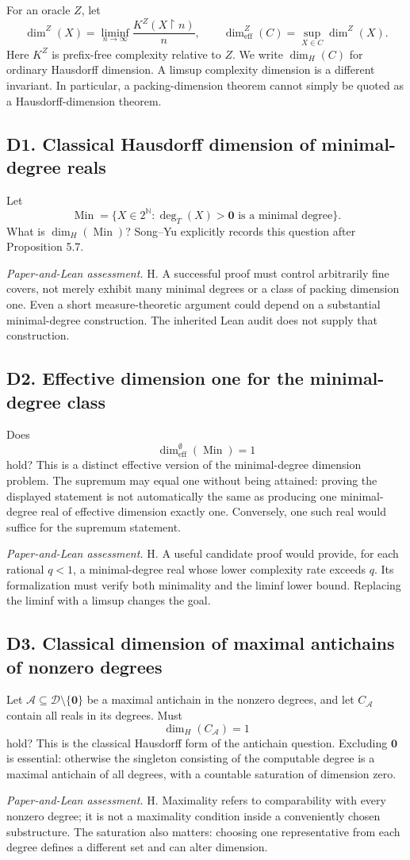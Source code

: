 \documentclass[11pt,a4paper]{article}
\newcommand{\N}{\mathbb N}
\newcommand{\D}{\mathcal D}
\newcommand{\Cantor}{2^{\N}}
\newcommand{\zero}{\mathbf0}
\newcommand{\Min}{\operatorname{Min}}\newcommand{\Computable}{\operatorname{Comp}}
\newcommand{\assessment}[1]{\par\noindent\textit{Paper-and-Lean assessment.} #1\par}
\newcommand{\problem}[2]{\subsection{#1. #2}\label{entry:#1}}
\theoremstyle{definition}\newtheorem{definition}[theorem]{Definition}
\theoremstyle{remark}\newtheorem{remark}[theorem]{Remark}
\begin{document}
For an oracle $Z$, let
\[
 \dim^Z(X)=\liminf_{n\to\infty}\frac{K^Z(X\upharpoonright n)}{n},
 \qquad
 \dim_{\mathrm{eff}}^Z(C)=\sup_{X\in C}\dim^Z(X).
\]
Here $K^Z$ is prefix-free complexity relative to $Z$. We write $\dim_H(C)$ for ordinary Hausdorff dimension. A limsup complexity dimension is a different invariant. In particular, a packing-dimension theorem cannot simply be quoted as a Hausdorff-dimension theorem.\cite{SY}

\problem{D1}{Classical Hausdorff dimension of minimal-degree reals}
Let
\[
 \Min=\{X\in\Cantor:\deg_T(X)>\zero\text{ is a minimal degree}\}.
\]
What is $\dim_H(\Min)$? Song--Yu explicitly records this question after Proposition 5.7.\cite{SY}

\assessment{H. A successful proof must control arbitrarily fine covers, not merely exhibit many minimal degrees or a class of packing dimension one. Even a short measure-theoretic argument could depend on a substantial minimal-degree construction. The inherited Lean audit does not supply that construction.}

\problem{D2}{Effective dimension one for the minimal-degree class}
Does
\[
                  \dim_{\mathrm{eff}}^{\emptyset}(\Min)=1
\]
hold? This is a distinct effective version of the minimal-degree dimension problem.\cite{SY} The supremum may equal one without being attained: proving the displayed statement is not automatically the same as producing one minimal-degree real of effective dimension exactly one. Conversely, one such real would suffice for the supremum statement.

\assessment{H. A useful candidate proof would provide, for each rational $q<1$, a minimal-degree real whose lower complexity rate exceeds $q$. Its formalization must verify both minimality and the liminf lower bound. Replacing the liminf with a limsup changes the goal.}

\problem{D3}{Classical dimension of maximal antichains of nonzero degrees}
Let $\mathcal A\subseteq\D\setminus\{\zero\}$ be a maximal antichain in the nonzero degrees, and let $C_{\mathcal A}$ contain all reals in its degrees. Must
\[
                       \dim_H(C_{\mathcal A})=1
\]
hold? This is the classical Hausdorff form of the antichain question.\cite{SY} Excluding $\zero$ is essential: otherwise the singleton consisting of the computable degree is a maximal antichain of all degrees, with a countable saturation of dimension zero.

\assessment{H. Maximality refers to comparability with every nonzero degree; it is not a maximality condition inside a conveniently chosen substructure. The saturation also matters: choosing one representative from each degree defines a different set and can alter dimension.}
\end{document}
